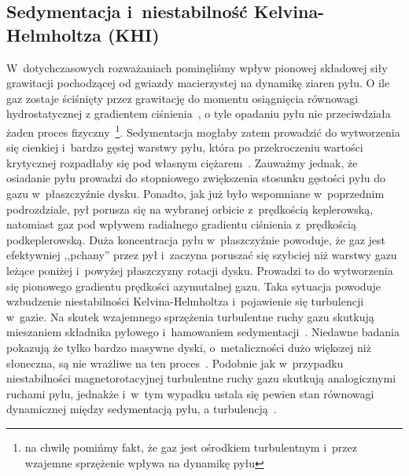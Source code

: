 \subsection{Sedymentacja i~niestabilność Kelvina-Helmholtza (KHI)}
W~dotychczasowych rozważaniach pominęliśmy wpływ pionowej składowej siły
grawitacji pochodzącej od gwiazdy macierzystej na dynamikę ziaren pyłu. O ile
gaz zostaje ściśnięty przez grawitację do momentu osiągnięcia równowagi
hydrostatycznej z gradientem ciśnienia~, o tyle opadaniu pyłu nie
przeciwdziała żaden proces fizyczny~\footnote{na chwilę pomińmy fakt, że gaz
jest ośrodkiem turbulentnym i~przez wzajemne sprzężenie wpływa na dynamikę
pyłu}. Sedymentacja mogłaby zatem prowadzić do wytworzenia się cienkiej i~bardzo
gęstej warstwy pyłu, która po przekroczeniu wartości krytycznej rozpadłaby się
pod własnym ciężarem~\citep{GW73}. Zauważmy jednak, że osiadanie pyłu prowadzi
do stopniowego zwiększenia stosunku gęstości pyłu do gazu w~płaszczyźnie dysku.
Ponadto, jak już było wspomniane w~poprzednim podrozdziale, pył porusza się na
wybranej orbicie z~prędkością keplerowską, natomiast gaz pod wpływem radialnego
gradientu ciśnienia z~prędkością podkeplerowską. Duża koncentracja pyłu
w~płaszczyźnie powoduje, że gaz jest efektywniej ,,pchany'' przez pył i~zaczyna
poruszać się szybciej niż warstwy gazu leżące poniżej i~powyżej płaszczyzny
rotacji dysku.  Prowadzi to do wytworzenia się pionowego gradientu prędkości
azymutalnej gazu.  Taka sytuacja powoduje wzbudzenie niestabilności
Kelvina-Helmholtza i~pojawienie się turbulencji w~gazie.  Na skutek wzajemnego
sprzężenia turbulentne ruchy gazu skutkują mieszaniem składnika pyłowego
i~hamowaniem sedymentacji~\cite{JHK06}. Niedawne badania pokazują że tylko
bardzo masywne dyski, o~metaliczności dużo większej niż słoneczna, są nie
wrażliwe na ten proces~\citep{L10}. Podobnie jak w~przypadku niestabilności
magnetorotacyjnej turbulentne ruchy gazu skutkują analogicznymi ruchami pyłu,
jednakże i~w~tym wypadku ustala się pewien stan równowagi dynamicznej między
sedymentacją pyłu, a turbulencją~\cite{JHK06}. 


